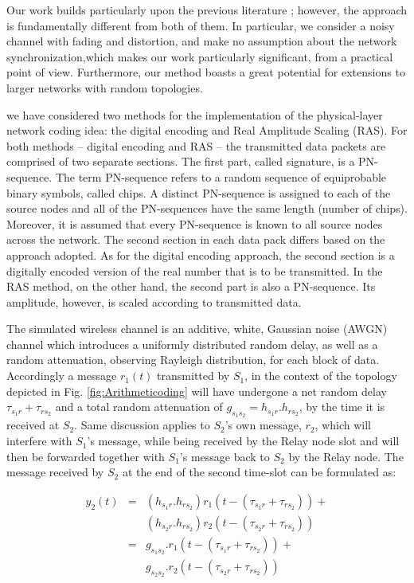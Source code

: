 \documentclass[conference]{IEEEtran}
\begin{document}
Our work builds particularly upon the previous literature \cite{yek,do}; however, the approach is fundamentally different from both of them. In particular, we consider a noisy channel with fading and distortion, and make no assumption about the network synchronization,which makes our work particularly significant, from a practical point of view. Furthermore, our method boasts a great potential for extensions to larger networks with random topologies.


we have considered two methods for the implementation of the physical-layer network coding idea: the digital encoding and Real Amplitude Scaling (RAS). For both methods -- digital encoding and RAS -- the transmitted data packets are comprised of two separate sections. The first part, called signature, is a PN-sequence. The term PN-sequence refers to a random sequence of equiprobable binary symbols, called chips. A distinct PN-sequence is assigned to each of the source nodes and all of the PN-sequences have the same length (number of chips). Moreover, it is assumed that every PN-sequence is known to all source nodes across the network. The second section in each data pack differs based on the approach adopted. As for the digital encoding approach, the second section is a digitally encoded version of the real number that is to be transmitted. In the RAS method, on the other hand, the second part is also a PN-sequence. Its amplitude, however, is scaled according to transmitted data.

The simulated wireless channel is an additive, white, Gaussian noise (AWGN) channel which introduces a uniformly distributed random delay, as well as a random attenuation, observing Rayleigh distribution, for each block of data. Accordingly a message $r_1(t)$ transmitted by $S_1$, in the context of the topology depicted in Fig. \ref{fig:Arithmeticoding} will have undergone a net random delay ${\tau}_{s_1r} + {\tau}_{rs_2}$ and a total random attenuation of $g_{s_1s_2} = h_{s_1r}.h_{rs_2}$, by the time it is received at $S_2$. Same discussion applies to $S_2$'s own message, $r_2$, which will interfere with $S_1$'s message, while being received by the Relay node slot and will then be forwarded together with $S_1$'s message back to $S_2$ by the Relay node. The message received by $S_2$ at the end of the second time-slot can be formulated as:

\begin{eqnarray}
y_{2}(t) &=& (h_{s_1r}.h_{rs_2})r_1(t-({\tau}_{s_1r} + {\tau}_{rs_2})) + \nonumber 
\\&& (h_{s_2r}.h_{rs_2})r_2(t-({\tau}_{s_2r} + {\tau}_{rs_2}))\\
&=& {g}_{s_1s_2}.r_{1}(t-({\tau}_{s_1r} + {\tau}_{rs_2})) + \nonumber 
\\&& g_{s_2s_2}.r_{2}(t-({\tau}_{s_2r} + {\tau}_{rs_2}))
\label{channel}
\end{eqnarray}
\end{document}
